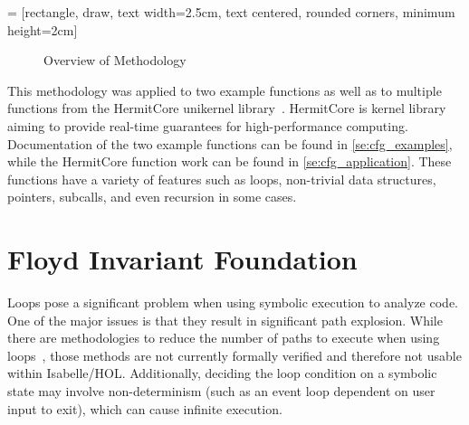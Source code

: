  = [rectangle, draw, text width=2.5cm, text centered, rounded corners, minimum height=2cm]
\begin{figure}
  \centering
  \caption{Overview of Methodology}\label{fig:cfg_overview}
\end{figure}

This methodology was applied to two example functions
as well as to multiple functions
from the HermitCore unikernel library~\citep{lankes2016hermitcore}.
HermitCore is  kernel library aiming to provide real-time guarantees for high-performance computing.
Documentation of the two example functions can be found in \cref{se:cfg_examples},
while the HermitCore function work can be found in \cref{se:cfg_application}.
These functions have a variety of features such as loops,
non-trivial data structures, pointers, subcalls, and even recursion in some cases.

\section{Floyd Invariant Foundation}\label{se:cfg_invariant}
Loops pose a significant problem when using symbolic execution to analyze code.
One of the major issues is that they result in significant path explosion.
While there are methodologies to reduce the number of paths to execute
when using loops~\citep{saxena2009lese,obdrzalek2011efficient},
those methods are not currently formally verified
and therefore not usable within Isabelle/HOL.
Additionally, deciding the loop condition on a symbolic state
may involve non-determinism (such as an event loop dependent on user input to exit),
which can cause infinite execution.


